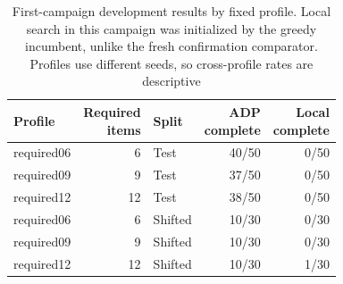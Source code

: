 \begin{table}[t]
  \centering
  \caption{First-campaign development results by fixed profile. Local search in this campaign was initialized by the greedy incumbent, unlike the fresh confirmation comparator. Profiles use different seeds, so cross-profile rates are descriptive}
  \label{tab:required-profile-results}
  \renewcommand{\arraystretch}{1.08}
  \setlength{\tabcolsep}{5pt}
  \footnotesize
  \begin{tabular*}{\linewidth}{@{\extracolsep{\fill}}lrlrr@{}}
    \toprule
    Profile & \shortstack[r]{Required\\items} & Split & \shortstack[r]{ADP\\complete} & \shortstack[r]{Local\\complete} \\
    \midrule
    required06 & 6 & Test & 40/50 & 0/50 \\
    required09 & 9 & Test & 37/50 & 0/50 \\
    required12 & 12 & Test & 38/50 & 0/50 \\
    required06 & 6 & Shifted & 10/30 & 0/30 \\
    required09 & 9 & Shifted & 10/30 & 0/30 \\
    required12 & 12 & Shifted & 10/30 & 1/30 \\
    \bottomrule
  \end{tabular*}
\end{table}
